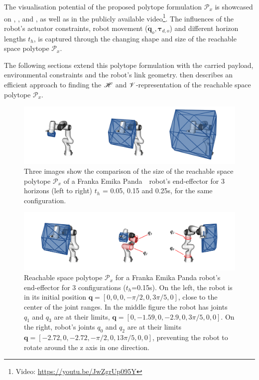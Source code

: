 The visualisation potential of the proposed polytope formulation $\mathcal{P}_x$ is showcased on , , and , as well as in the publicly available video\footnote{Video: \url{https://youtu.be/JwZgrUp095Y}}. The influences of the robot's actuator constraints, robot movement ($\dot{\bm{q}}_o,\bm{\tau}_{d,o}$) and different horizon lengths $t_h$, is captured through the changing shape and size of the reachable space polytope $\mathcal{P}_x$.

The following sections extend this polytope formulation with the carried payload, environmental constraints and the robot's link geometry.  then describes an efficient approach to finding the $\mathscr{H}$ and $\mathscr{V}$-representation of the reachable space polytope $\mathcal{P}_x$. 


\begin{figure}[!h]
    \centering
    \includegraphics[width=\linewidth]{Papers/images/horizon.png}
    \caption{Three images show the comparison of the size of the reachable space polytope $\mathcal{P}_x$ of a Franka Emika Panda\protect\footnotemark ~~robot's end-effector for 3 horizons  (left to right) $t_h$ = 0.05, 0.15 and 0.25s, for the same configuration. } 
    \label{fig:horizon}
\end{figure}

\begin{figure}[!h]
    \centering
    \includegraphics[width=\linewidth]{Papers/images/limits.png}
    \caption{Reachable space polytope $\mathcal{P}_x$ for a Franka Emika Panda robot's end-effector for 3 configurations ($t_h$=0.15s). On the left, the robot is in its initial position $\bm{q}=[0,0,0,-\pi/2, 0, 3\pi/5,0]$, close to the center of the joint ranges. 
    In the middle figure the robot has joints $q_1$ and $q_3$ are at their limits, $\bm{q}=[0,-1.59,0,-2.9,0,3\pi/5,0,0]$. 
    On the right, robot's joints $q_0$ and $q_2$ are at their limits $\bm{q}=[-2.72,0, -2.72,-\pi/2,0,13\pi/5,0,0]$, preventing the robot to rotate around the z axis in one direction.
    }
    \label{fig:limits}
\end{figure}

